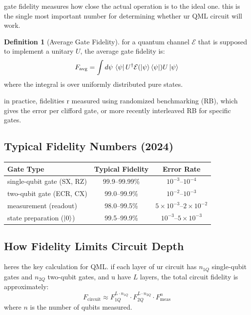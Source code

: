 \documentclass[11pt,a4paper]{article}
\theoremstyle{definition}
\newtheorem{definition}{Definition}[section]
\theoremstyle{remark}
\begin{document}
gate fidelity measures how close the actual operation is to the ideal one. this is the single most important number for determining whether ur QML circuit will work.

\begin{definition}[Average Gate Fidelity]
for a quantum channel $\mathcal{E}$ that is supposed to implement a unitary $U$, the average gate fidelity is:
\[
F_{\text{avg}} = \int d\psi \, \bra{\psi} U^\dagger \mathcal{E}(\ket{\psi}\bra{\psi}) U \ket{\psi}
\]
where the integral is over uniformly distributed pure states.
\end{definition}

in practice, fidelities r measured using randomized benchmarking (RB), which gives the error per clifford gate, or more recently interleaved RB for specific gates.

\subsection{Typical Fidelity Numbers (2024)}

\begin{center}
\renewcommand{\arraystretch}{1.3}
\begin{tabular}{|l|c|c|}
\hline
\textbf{Gate Type} & \textbf{Typical Fidelity} & \textbf{Error Rate} \\
\hline
single-qubit gate (SX, RZ) & 99.9--99.99\% & $10^{-3}$--$10^{-4}$ \\
\hline
two-qubit gate (ECR, CX) & 99.0--99.9\% & $10^{-2}$--$10^{-3}$ \\
\hline
measurement (readout) & 98.0--99.5\% & $5 \times 10^{-3}$--$2 \times 10^{-2}$ \\
\hline
state preparation ($\ket{0}$) & 99.5--99.9\% & $10^{-3}$--$5 \times 10^{-3}$ \\
\hline
\end{tabular}
\end{center}

\subsection{How Fidelity Limits Circuit Depth}

heres the key calculation for QML. if each layer of ur circuit has $n_{1Q}$ single-qubit gates and $n_{2Q}$ two-qubit gates, and u have $L$ layers, the total circuit fidelity is approximately:
\[
F_{\text{circuit}} \approx F_{1Q}^{L \cdot n_{1Q}} \cdot F_{2Q}^{L \cdot n_{2Q}} \cdot F_{\text{meas}}^n
\]
where $n$ is the number of qubits measured.
\end{document}
